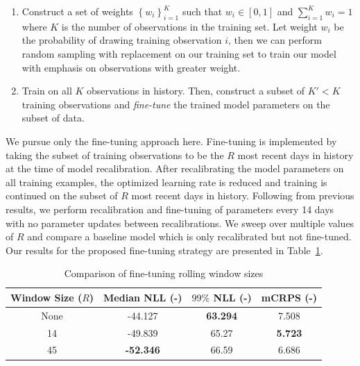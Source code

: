 \begin{enumerate}
    \item Construct a set of weights $\left\{ w_i \right\}_{i=1}^K$ such that $w_i \in [0, 1]$ and
    $\sum_{i=1}^K w_i = 1$ where $K$ is the number of observations in the training set.
    Let weight $w_i$ be the probability of drawing training observation $i$, then we can perform random sampling with
    replacement on our training set to train our model with emphasis on observations with greater weight.
    \item Train on all $K$ observations in history.
    Then, construct a subset of $K' < K$ training observations and \textit{fine-tune} the trained model parameters on
    the subset of data.
\end{enumerate}

We pursue only the fine-tuning approach here.
Fine-tuning is implemented by taking the subset of training observations to be the $R$ most recent
days in history at the time of model recalibration.
After recalibrating the model parameters on all training examples, the optimized learning rate is reduced and training
is continued on the subset of $R$ most recent days in history.
Following from previous results, we perform recalibration and fine-tuning of parameters every 14 days with no parameter
updates between recalibrations.
We sweep over multiple values of $R$ and compare a baseline model which is only recalibrated but not fine-tuned.
Our results for the proposed fine-tuning strategy are presented in Table~\ref{tab:finetune}.

\begin{table}[htb]
    \caption[Results of rolling window fine-tuning]{
        Comparison of fine-tuning rolling window sizes
    }
    \begin{center}
        \begin{tabular}{||c|c|c|c||} \hline
        Window Size ($R$) & Median NLL (-)  & $99\%$ NLL (-) & mCRPS (-)  \\	%
        \hline \hline
        None &          -44.127  & \textbf{63.294} &         7.508  \\ \hline
        14   &          -49.839  &         65.27   & \textbf{5.723} \\ \hline
        45   &  \textbf{-52.346} &         66.59   &         6.686  \\ \hline
        \end{tabular}
        \\ \rule{0mm}{5mm}
    \end{center}
    \label{tab:finetune}
\end{table}

